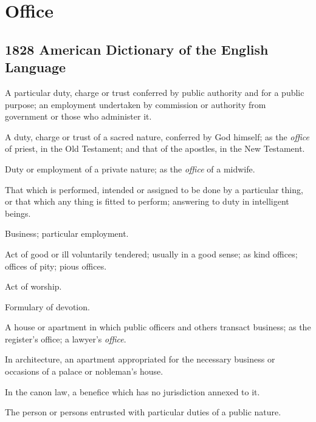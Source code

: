 \section{Office}
	\label{OFFICE}
	

\subsection{1828 American Dictionary of the English Language} %
	\label{OFFICE-1828}

	\begin{compactitem}
		\item[1] A particular duty, charge or trust conferred by public authority and for a public purpose; an employment undertaken by commission or authority from government or those who administer it.
		\item[2] A duty, charge or trust of a sacred nature, conferred by God himself; as the \textit{office} of priest, in the Old Testament; and that of the apostles, in the New Testament.
		\item[3] Duty or employment of a private nature; as the \textit{office} of a midwife.
		\item[4] That which is performed, intended or assigned to be done by a particular thing, or that which any thing is fitted to perform; answering to duty in intelligent beings.
		\item[5] Business; particular employment.
		\item[6] Act of good or ill voluntarily tendered; usually in a good sense; as kind offices; offices of pity; pious offices.
		\item[7] Act of worship.
		\item[8] Formulary of devotion.
		\item[9] A house or apartment in which public officers and others transact business; as the register's office; a lawyer's \textit{office}.
		\item[10] In architecture, an apartment appropriated for the necessary business or occasions of a palace or nobleman's house.
		\item[11] In the canon law, a benefice which has no jurisdiction annexed to it.
		\item[12] The person or persons entrusted with particular duties of a public nature.
	\end{compactitem}

